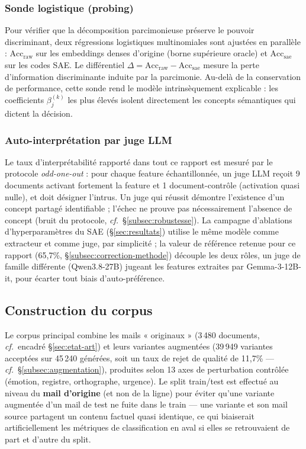 \documentclass[11pt]{article}
\begin{document}
\subsubsection{Sonde logistique (probing)}
Pour vérifier que la décomposition parcimonieuse préserve le pouvoir
discriminant, deux régressions logistiques multinomiales sont ajustées en
parallèle : $\text{Acc}_\text{raw}$ sur les embeddings denses d'origine
(borne supérieure oracle) et $\text{Acc}_\text{sae}$ sur les codes SAE. Le
différentiel $\Delta = \text{Acc}_\text{raw} - \text{Acc}_\text{sae}$ mesure
la perte d'information discriminante induite par la parcimonie. Au-delà de la
conservation de performance, cette sonde rend le modèle intrinsèquement
explicable : les coefficients $\beta_j^{(k)}$ les plus élevés isolent
directement les concepts sémantiques qui dictent la décision.

\subsubsection{Auto-interprétation par juge LLM}
Le taux d'interprétabilité rapporté dans tout ce rapport est mesuré par le
protocole \emph{odd-one-out} \cite{karvonen2025saebench} : pour chaque feature échantillonnée, un juge LLM
reçoit 9 documents activant fortement la feature et 1 document-contrôle
(activation quasi nulle), et doit désigner l'intrus. Un juge qui réussit
démontre l'existence d'un concept partagé identifiable ; l'échec ne prouve pas
nécessairement l'absence de concept (bruit du protocole,
\emph{cf.}~\S\ref{subsec:robustesse}). La campagne d'ablations
d'hyperparamètres du SAE (\S\ref{sec:resultats}) utilise le même modèle comme
extracteur et comme juge, par simplicité ; la valeur de référence retenue
pour ce rapport (65,7\%, \S\ref{subsec:correction-methode}) découple les deux
rôles, un juge de famille différente (Qwen3.8-27B) jugeant les features
extraites par Gemma-3-12B-it, pour écarter tout biais d'auto-préférence.

\subsection{Construction du corpus}

Le corpus principal combine les mails « originaux » (3\,480 documents,
\emph{cf.}~encadré \S\ref{sec:etat-art}) et leurs variantes augmentées
(39\,949 variantes acceptées sur 45\,240 générées, soit un taux de rejet de
qualité de 11,7\% --- \emph{cf.}~\S\ref{subsec:augmentation}), produites selon
13 axes de perturbation contrôlée (émotion, registre, orthographe, urgence).
Le split train/test est effectué au niveau du \textbf{mail d'origine} (et non
de la ligne) pour éviter qu'une variante augmentée d'un mail de test ne fuite
dans le train --- une variante et son mail source partagent un contenu
factuel quasi identique, ce qui biaiserait artificiellement les métriques de
classification en aval si elles se retrouvaient de part et d'autre du split.
\end{document}
